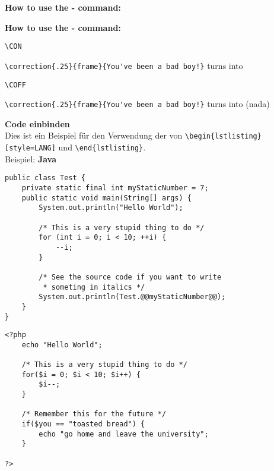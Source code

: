 \documentclass{uni_tue_template}
\begin{document}
\textbf{How to use the  - command:}



\textbf{How to use the  - command:}

\verb+\CON+
\CON

\verb+\correction{.25}{frame}{You've been a bad boy!}+ turns into 

\verb+\COFF+
\COFF

\verb+\correction{.25}{frame}{You've been a bad boy!}+ turns into  (nada)

\newpage

\textbf{Code einbinden}\vspace{2mm}\\
Dies ist ein Beispiel für den Verwendung der von \verb+\begin{lstlisting}[style=LANG]+ und \verb+\end{lstlisting}+.\vspace{3mm}\\
Beispiel: \textbf{Java}

\begin{lstlisting}[style=java]
public class Test {
	private static final int myStaticNumber = 7;
	public static void main(String[] args) {
		System.out.println("Hello World");
		
		/* This is a very stupid thing to do */
		for (int i = 0; i < 10; ++i) {
			--i;
		}
		
		/* See the source code if you want to write 
		 * someting in italics */
		System.out.println(Test.@@myStaticNumber@@);
	}
}
\end{lstlisting}

\begin{lstlisting}[style=php]
<?php
	echo "Hello World";
	
	/* This is a very stupid thing to do */
	for($i = 0; $i < 10; $i++) {
		$i--;
	}
	
	/* Remember this for the future */
	if($you == "toasted bread") {
		echo "go home and leave the university";
	}

?>
\end{lstlisting}
\end{document}
